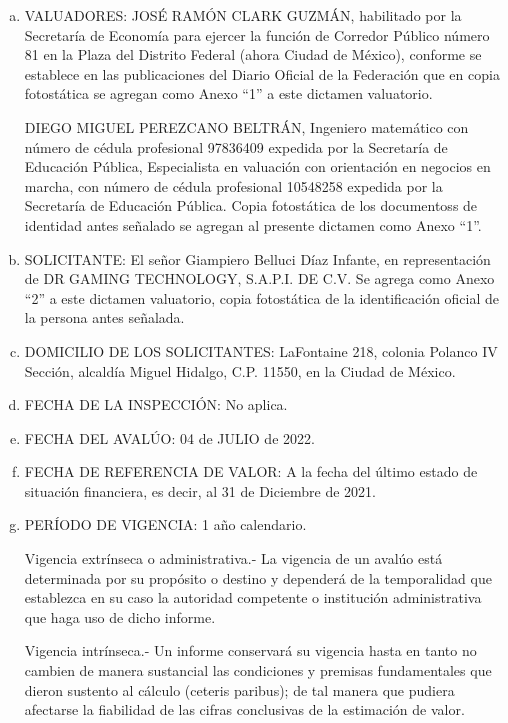 \documentclass[10pt,letter]{report}
\begin{document}
\begin{enumerate}[a.]

\item VALUADORES: JOSÉ RAMÓN CLARK GUZMÁN, habilitado por la Secretaría de Economía para ejercer la función de Corredor Público número 81 en la Plaza del Distrito Federal (ahora Ciudad de México), conforme se establece en las publicaciones del Diario Oficial de la Federación que en copia fotostática se agregan como Anexo “1” a este dictamen valuatorio.

DIEGO MIGUEL PEREZCANO BELTRÁN, Ingeniero matemático con número de cédula profesional 97836409 expedida por la Secretaría de Educación Pública, Especialista en valuación con orientación en negocios en marcha, con número de cédula profesional 10548258 expedida por la Secretaría de Educación Pública. Copia fotostática de los documentoss de identidad antes señalado se agregan al presente dictamen como Anexo “1”.

\item SOLICITANTE: El señor Giampiero Belluci Díaz Infante, en representación de DR GAMING TECHNOLOGY, S.A.P.I. DE C.V. Se agrega como Anexo “2” a este dictamen valuatorio, copia fotostática de la identificación oficial de la persona antes señalada. 

\item DOMICILIO DE LOS SOLICITANTES: LaFontaine 218, colonia Polanco IV Sección, alcaldía Miguel Hidalgo, C.P. 11550, en la Ciudad de México.

\item FECHA DE LA INSPECCIÓN: No aplica.

\item FECHA DEL AVALÚO: 04 de JULIO de 2022.

\item FECHA DE REFERENCIA DE VALOR: A la fecha del último estado de situación financiera, es decir, al 31 de Diciembre de 2021.

\item PERÍODO DE VIGENCIA: 1 año calendario. 

Vigencia extrínseca o administrativa.- La vigencia de un avalúo está determinada por su propósito o destino y dependerá de la temporalidad que establezca en su caso la autoridad competente o institución administrativa que haga uso de dicho informe.

Vigencia intrínseca.- Un informe conservará su vigencia hasta en tanto no cambien de manera sustancial las condiciones y premisas fundamentales que dieron sustento al cálculo (ceteris paribus); de tal manera que pudiera afectarse la fiabilidad de las cifras conclusivas de la estimación de valor.


\end{enumerate}
\end{document}
